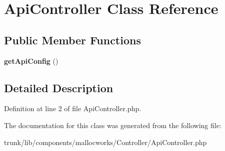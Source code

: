 \hypertarget{class_api_controller}{
\section{ApiController Class Reference}
\label{class_api_controller}
}
\subsection*{Public Member Functions}
\begin{DoxyCompactItemize}
\item 
\hypertarget{class_api_controller_a6287b9357d59469a9379ecf261bd59df}{
{\bfseries getApiConfig} ()}
\label{class_api_controller_a6287b9357d59469a9379ecf261bd59df}

\end{DoxyCompactItemize}


\subsection{Detailed Description}


Definition at line 2 of file ApiController.php.



The documentation for this class was generated from the following file:\begin{DoxyCompactItemize}
\item 
trunk/lib/components/mallocworks/Controller/ApiController.php\end{DoxyCompactItemize}
